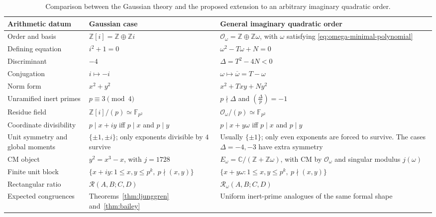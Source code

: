 \documentclass[a4paper,american,11pt]{amsart}
\numberwithin{equation}{section}
\theoremstyle{definition}
\newcommand{\Z}{\mathbb Z}
\newcommand{\F}{\mathbb F}
\newcommand{\Rect}{\mathcal R}
\begin{document}
\begin{table}[ht]
\centering
\small
\renewcommand{\arraystretch}{1.18}
\begin{tabularx}{\textwidth}{>{\raggedright\arraybackslash}p{}
>{\raggedright\arraybackslash}p{}
>{\raggedright\arraybackslash}X}
\toprule
\textbf{Arithmetic datum}
& \textbf{Gaussian case}
& \textbf{General imaginary quadratic order}\\
\midrule
Order and basis
& $\Z[i]=\Z\oplus\Z i$
& $\mathcal O_\omega=\Z\oplus\Z\omega$, with $\omega$ satisfying \eqref{eq:omega-minimal-polynomial} \\
Defining equation
& $i^2+1=0$
& $\omega^2-T\omega+N=0$ \\
Discriminant
& $-4$
& $\Delta=T^2-4N<0$ \\
Conjugation
& $i\mapsto-i$
& $\omega\mapsto\overline\omega=T-\omega$ \\
Norm form
& $x^2+y^2$
& $x^2+Txy+Ny^2$ \\
Unramified inert primes
& $p\equiv3\pmod4$
& $p\nmid\Delta$ and $\left(\frac{\Delta}{p}\right)=-1$ \\
Residue field
& $\Z[i]/(p)\simeq\F_{p^2}$
& $\mathcal O_\omega/(p)\simeq\F_{p^2}$ \\
Coordinate divisibility
& $p\mid x+iy$ iff $p\mid x$ and $p\mid y$
& $p\mid x+y\omega$ iff $p\mid x$ and $p\mid y$ \\
Unit symmetry and global moments
& $\{\pm1,\pm i\}$; only exponents divisible by $4$ survive
& Usually $\{\pm1\}$; only even exponents are forced to survive.  The cases $\Delta=-4,-3$ have extra symmetry \\
CM object
& $y^2=x^3-x$, with $j=1728$
& $E_\omega=\mathbb C/(\Z+\Z\omega)$, with CM by $\mathcal O_\omega$ and singular modulus $j(\omega)$ \\
Finite unit block
& $\{x+iy:1\leq x,y\leq p^k,\ p\nmid(x,y)\}$
& $\{x+y\omega:1\leq x,y\leq p^k,\ p\nmid(x,y)\}$ \\
Rectangular ratio
& $\Rect(A,B;C,D)$
& $\mathcal R_\omega(A,B;C,D)$ \\
Expected congruences
& Theorems~\ref{thm:ljunggren} and~\ref{thm:bailey}
& Uniform inert-prime analogues of the same formal shape \\
\bottomrule
\end{tabularx}
\caption{Comparison between the Gaussian theory and the proposed extension to an arbitrary imaginary quadratic order.}
\label{tab:gaussian-general-quadratic}
\end{table}
\end{document}
